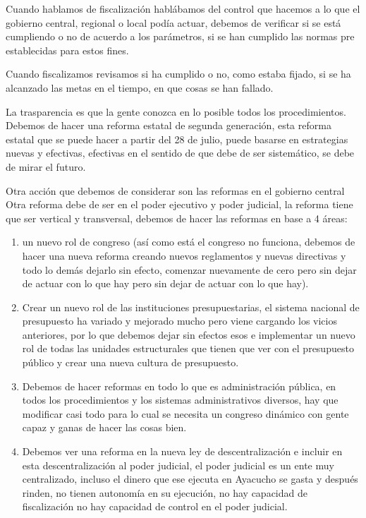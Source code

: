 \documentclass[
  a4paper,
]{article}
\begin{document}
Cuando hablamos de fiscalización hablábamos del control que hacemos a lo
que el gobierno central, regional o local podía actuar, debemos de
verificar si se está cumpliendo o no de acuerdo a los parámetros, si se
han cumplido las normas pre establecidas para estos fines.

Cuando fiscalizamos revisamos si ha cumplido o no, como estaba fijado,
si se ha alcanzado las metas en el tiempo, en que cosas se han fallado.

La trasparencia es que la gente conozca en lo posible todos los
procedimientos. Debemos de hacer una reforma estatal de segunda
generación, esta reforma estatal que se puede hacer a partir del 28 de
julio, puede basarse en estrategias nuevas y efectivas, efectivas en el
sentido de que debe de ser sistemático, se debe de mirar el futuro.

Otra acción que debemos de considerar son las reformas en el gobierno
central Otra reforma debe de ser en el poder ejecutivo y poder judicial,
la reforma tiene que ser vertical y transversal, debemos de hacer las
reformas en base a 4 áreas:

\begin{enumerate}
\def\labelenumi{\arabic{enumi}.}
\item
  un nuevo rol de congreso (así como está el congreso no funciona,
  debemos de hacer una nueva reforma creando nuevos reglamentos y nuevas
  directivas y todo lo demás dejarlo sin efecto, comenzar nuevamente de
  cero pero sin dejar de actuar con lo que hay pero sin dejar de actuar
  con lo que hay).
\item
  Crear un nuevo rol de las instituciones presupuestarias, el sistema
  nacional de presupuesto ha variado y mejorado mucho pero viene
  cargando los vicios anteriores, por lo que debemos dejar sin efectos
  esos e implementar un nuevo rol de todas las unidades estructurales
  que tienen que ver con el presupuesto público y crear una nueva
  cultura de presupuesto.
\item
  Debemos de hacer reformas en todo lo que es administración pública, en
  todos los procedimientos y los sistemas administrativos diversos, hay
  que modificar casi todo para lo cual se necesita un congreso dinámico
  con gente capaz y ganas de hacer las cosas bien.
\item
  Debemos ver una reforma en la nueva ley de descentralización e incluir
  en esta descentralización al poder judicial, el poder judicial es un
  ente muy centralizado, incluso el dinero que ese ejecuta en Ayacucho
  se gasta y después rinden, no tienen autonomía en su ejecución, no hay
  capacidad de fiscalización no hay capacidad de control en el poder
  judicial.
\end{enumerate}
\end{document}
